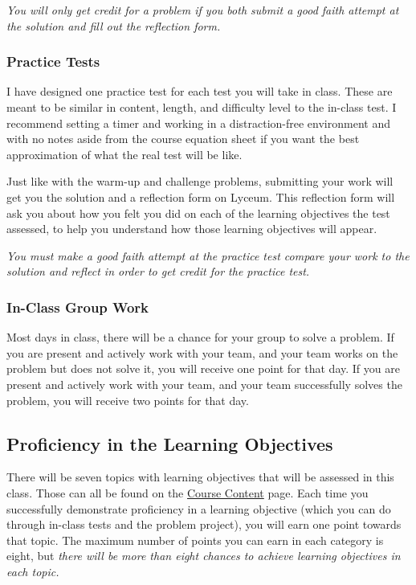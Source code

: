 \documentclass[
  letterpaper,
  DIV=11,
  numbers=noendperiod]{scrartcl}
\begin{document}
\emph{You will only get credit for a problem if you both submit a good
faith attempt at the solution and fill out the reflection form.}

\subsubsection{Practice Tests}

I have designed one practice test for each test you will take in class.
These are meant to be similar in content, length, and difficulty level
to the in-class test. I recommend setting a timer and working in a
distraction-free environment and with no notes aside from the course
equation sheet if you want the best approximation of what the real test
will be like.

Just like with the warm-up and challenge problems, submitting your work
will get you the solution and a reflection form on Lyceum. This
reflection form will ask you about how you felt you did on each of the
learning objectives the test assessed, to help you understand how those
learning objectives will appear.

\emph{You must make a good faith attempt at the practice test compare
your work to the solution and reflect in order to get credit for the
practice test.}

\subsubsection{In-Class Group Work}

Most days in class, there will be a chance for your group to solve a
problem. If you are present and actively work with your team, and your
team works on the problem but does not solve it, you will receive one
point for that day. If you are present and actively work with your team,
and your team successfully solves the problem, you will receive two
points for that day.

\subsection{Proficiency in the Learning Objectives}\label{LOgrade}

There will be seven topics with learning objectives that will be
assessed in this class. Those can all be found on the
\hyperref[coursecontent]{Course Content} page. Each time you
successfully demonstrate proficiency in a learning objective (which you
can do through in-class tests and the problem project), you will earn
one point towards that topic. The maximum number of points you can earn
in each category is eight, but \emph{there will be more than eight
chances to achieve learning objectives in each topic.}
\end{document}
